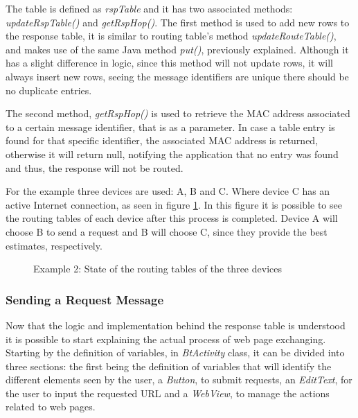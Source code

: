 The table is defined as \textit{rspTable} and it has two associated methods: \textit{updateRspTable()} and \textit{getRspHop()}. The first method is used to add new rows to the response table, it is similar to routing table's method \textit{updateRouteTable()}, and makes use of the same Java method \textit{put()}, previously explained. Although it has a slight difference in logic, since this method will not update rows, it will always insert new rows, seeing the message identifiers are unique there should be no duplicate entries.

The second method, \textit{getRspHop()} is used to retrieve the \gls{MAC} address associated to a certain message identifier, that is as a parameter. In case a table entry is found for that specific identifier, the associated \gls{MAC} address is returned, otherwise it will return null, notifying the application that no entry was found and thus, the response will not be routed.

For the example three devices are used: A, B and C. Where device C has an active Internet connection, as seen in figure \ref{fig:example1.0}. In this figure it is possible to see the routing tables of each device after this process is completed. Device A will choose B to send a request and B will choose C, since they provide the best estimates, respectively.

\begin{figure}[ht]
   \noindent{}
	\caption{\label{fig:example1.0} Example 2: State of the routing tables of the three devices}
\end{figure}

\subsubsection{Sending a Request Message}
\label{subsubsec:sendrqt}

Now that the logic and implementation behind the response table is understood it is possible to start explaining the actual process of web page exchanging. Starting by the definition of variables, in \textit{BtActivity} class, it can be divided into three sections: the first being the definition of variables that will identify the different elements seen by the user, a \textit{Button}, to submit requests, an \textit{EditText}, for the user to input the requested \gls{URL} and a \textit{WebView}, to manage the actions related to web pages.


